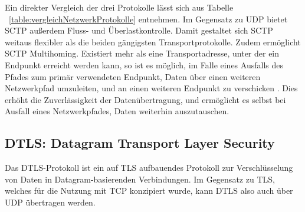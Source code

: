 Ein direkter Vergleich der drei Protokolle lässt sich aus Tabelle ~\ref{table:vergleichNetzwerkProtokolle} entnehmen. Im Gegensatz zu \acs{UDP} bietet \acs{SCTP} außerdem Fluss- und Überlastkontrolle. Damit gestaltet sich \acs{SCTP} weitaus flexibler als die beiden gängigsten Transportprotokolle. Zudem ermöglicht \acs{SCTP} Multihoming. Existiert mehr als eine Transportadresse, unter der ein Endpunkt erreicht werden kann, so ist es möglich, im Falle eines Ausfalls des Pfades zum primär verwendeten Endpunkt, Daten über einen weiteren Netzwerkpfad umzuleiten, und an einen weiteren Endpunkt zu verschicken \cite{sctpRFC, multihoming}. Dies erhöht die Zuverlässigkeit der Datenübertragung, und ermöglicht es selbst bei Ausfall eines Netzwerkpfades, Daten weiterhin auszutauschen.\par



\subsection{DTLS: Datagram Transport Layer Security}
Das \acf{DTLS}-Protokoll ist ein auf \acf{TLS} aufbauendes Protokoll zur Verschlüsselung von Daten in Datagram-basierenden Verbindungen. Im Gegensatz zu \acs{TLS}, welches für die Nutzung mit \acs{TCP} konzipiert wurde, kann \acs{DTLS} also auch über \acs{UDP} übertragen werden.\par


